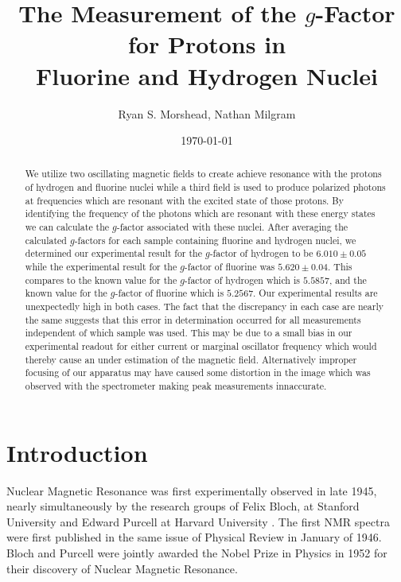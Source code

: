 \documentclass[prb,preprint]{revtex4-1}
\begin{document}
\title{The Measurement of the $g$-Factor for Protons in \\ Fluorine and Hydrogen Nuclei}

\author{Ryan S. Morshead, Nathan Milgram}


\date{\today}

\begin{abstract}

We utilize two oscillating magnetic fields to create achieve resonance with the protons of hydrogen and fluorine nuclei while a third field is used to produce polarized photons at frequencies which are resonant with the excited state of those protons. By identifying the frequency of the photons which are resonant with these energy states we can calculate the $g$-factor associated with these nuclei. After averaging the calculated $g$-factors for each sample containing fluorine and hydrogen nuclei, we determined our experimental result for the $g$-factor of hydrogen to be $6.010\pm0.05$ while the experimental result for the $g$-factor of fluorine was $5.620\pm0.04$. This compares to the known value for the $g$-factor of hydrogen which is $5.5857$, and the known value for the $g$-factor of fluorine which is $5.2567$. Our experimental results are unexpectedly high in both cases. The fact that the discrepancy in each case are nearly the same suggests that this error in determination occurred for all measurements independent of which sample was used. This may be due to a small bias in our experimental readout for either current or marginal oscillator frequency which would thereby cause an under estimation of the magnetic field. Alternatively improper focusing of our apparatus may have caused some distortion in the image which was observed with the spectrometer making peak measurements innaccurate.

\end{abstract}



\maketitle


\section{Introduction}

Nuclear Magnetic Resonance was first experimentally observed in late 1945, nearly simultaneously by the research groups of Felix Bloch, at Stanford University and Edward Purcell at Harvard University \cite{nobel}. The first NMR spectra were first published in the same issue of Physical Review in January of 1946. Bloch and Purcell were jointly awarded the Nobel Prize in Physics in 1952 for their discovery of Nuclear Magnetic Resonance.
\end{document}
